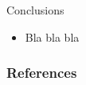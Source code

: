 \documentclass[handout]{beamer}
\begin{document}
\begin{frame}{Conclusions}
 \scriptsize{

\begin{itemize}
 \item Bla bla bla
 
 
\end{itemize}


}
\end{frame}




\begin{frame}[allowframebreaks]\scriptsize
\frametitle{References}


%
\end{frame}  









\end{document}
